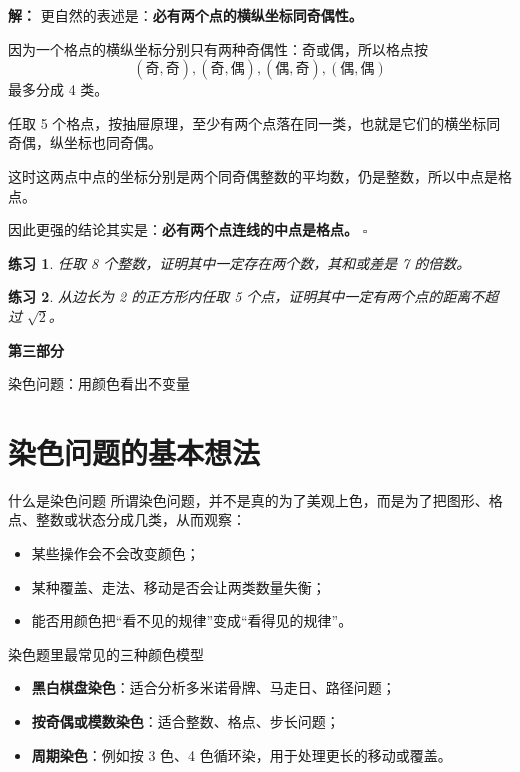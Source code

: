 \documentclass[11pt,a4paper,fontset=fandol]{ctexart}
\theoremstyle{formaltheorem}
\theoremstyle{formalexample}
\newtheorem{exercise}{练习}[section]
\newenvironment{solution}{\par\noindent\textbf{解：}}{\hfill$\square$\par}
\newcommand{\partdivider}[2]{%
  \clearpage
  \thispagestyle{empty}
  \vspace*{\fill}
  \begin{center}
  \begin{tcolorbox}[
    enhanced,
    width=0.78\textwidth,
    colback=lightblue,
    colframe=mainblue,
    boxrule=0.9pt,
    arc=0mm,
    left=6mm,
    right=6mm,
    top=8mm,
    bottom=8mm
  ]
  \centering
  {\fontsize{24}{30}\selectfont\bfseries #1\par}
  \vspace{0.6cm}
  {\large #2\par}
  \end{tcolorbox}
  \end{center}
  \vspace*{\fill}
  \clearpage
}
\begin{document}
\begin{solution}
更自然的表述是：\textbf{必有两个点的横纵坐标同奇偶性。}

因为一个格点的横纵坐标分别只有两种奇偶性：奇或偶，所以格点按
\[
(\text{奇},\text{奇}),(\text{奇},\text{偶}),(\text{偶},\text{奇}),(\text{偶},\text{偶})
\]
最多分成 4 类。

任取 5 个格点，按抽屉原理，至少有两个点落在同一类，也就是它们的横坐标同奇偶，纵坐标也同奇偶。

这时这两点中点的坐标分别是两个同奇偶整数的平均数，仍是整数，所以中点是格点。

因此更强的结论其实是：\textbf{必有两个点连线的中点是格点。}
\end{solution}

\begin{exercise}
任取 8 个整数，证明其中一定存在两个数，其和或差是 7 的倍数。
\end{exercise}

\begin{exercise}
从边长为 2 的正方形内任取 5 个点，证明其中一定有两个点的距离不超过 $\sqrt{2}$。
\end{exercise}

\partdivider{第三部分}{染色问题：用颜色看出不变量}

\section{染色问题的基本想法}

\begin{goalbox}{什么是染色问题}
所谓染色问题，并不是真的为了美观上色，而是为了把图形、格点、整数或状态分成几类，从而观察：
\begin{itemize}
  \item 某些操作会不会改变颜色；
  \item 某种覆盖、走法、移动是否会让两类数量失衡；
  \item 能否用颜色把“看不见的规律”变成“看得见的规律”。
\end{itemize}
\end{goalbox}

\begin{notebox}{染色题里最常见的三种颜色模型}
\begin{itemize}
  \item \textbf{黑白棋盘染色}：适合分析多米诺骨牌、马走日、路径问题；
  \item \textbf{按奇偶或模数染色}：适合整数、格点、步长问题；
  \item \textbf{周期染色}：例如按 3 色、4 色循环染，用于处理更长的移动或覆盖。
\end{itemize}
\end{notebox}
\end{document}
